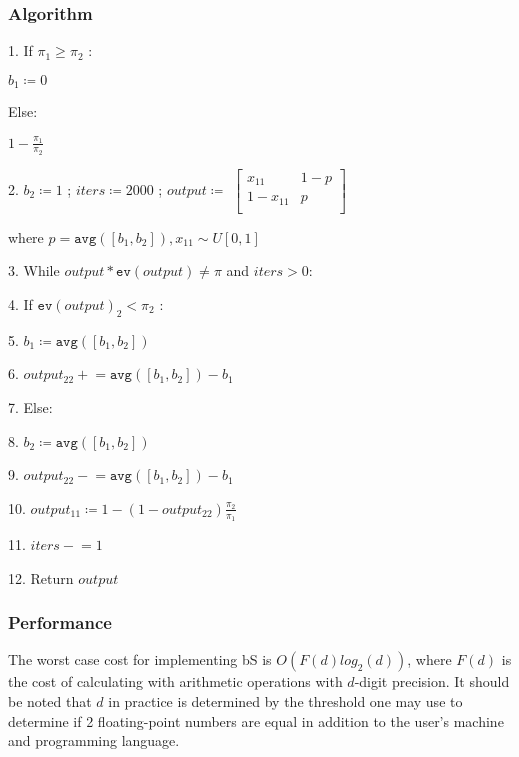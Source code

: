 \documentclass{article}
\begin{document}
\subsubsection{Algorithm}
1. If $\pi_1 \geq \pi_2$ :

\hspace{1cm} $b_1 \coloneqq 0$

\hspace{4mm}Else:

\hspace{1cm}$1-\frac{\pi_1}{\pi_2}$

2. $b_2 \coloneqq 1$ ; $iters \coloneqq 2000$ ; $output \coloneqq $
$\begin{bmatrix}
    x_{11}       & 1-p \\
    1-x_{11}       & p \\
\end{bmatrix}$

\hspace{4mm}where $p = \texttt{avg}([b_1, b_2]), x_{11} \sim U[0,1]$

3. While $output*\texttt{ev}(output) \neq \pi$ and $iters > 0$:

4. \hspace{1cm} If $\texttt{ev}(output)_2 < \pi_2$ :

5. \hspace{2cm} $b_1 \coloneqq \texttt{avg}([b_1, b_2])$

6. \hspace{2cm} $output_{22} \mathrel{+}= \texttt{avg}([b_1, b_2])-b_1$

7. \hspace{1.4cm} Else:

8. \hspace{2cm} $b_2 \coloneqq \texttt{avg}([b_1, b_2])$

9. \hspace{2cm} $output_{22} \mathrel{-}= \texttt{avg}([b_1, b_2])-b_1$

10. \hspace{1cm} $output_{11} \coloneqq 1 - (1-output_{22})\frac{\pi_2}{\pi_1}$

11. \hspace{1cm} $iters \mathrel{-}= 1$

12. Return $output$

\subsubsection{Performance}
The worst case cost for implementing bS is $O(F(d)log_2(d))$, where $F(d)$ is the cost of calculating with arithmetic operations with $d$-digit precision. It should be noted that $d$ in practice is determined by the threshold one may use to determine if 2 floating-point numbers are equal in addition to the user's machine and programming language.
\end{document}

